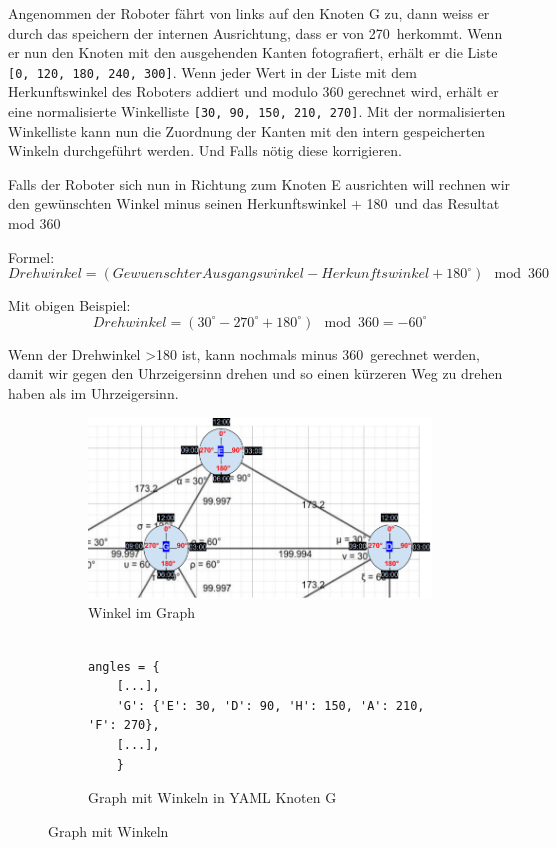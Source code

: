 Angenommen der Roboter fährt von links auf den Knoten G zu, dann weiss er durch das speichern der internen Ausrichtung, dass er von 270\textdegree\ herkommt. Wenn er nun den Knoten mit den ausgehenden Kanten fotografiert, erhält er die Liste \verb|[0, 120, 180, 240, 300]|.  Wenn jeder Wert in der Liste mit dem Herkunftswinkel des Roboters addiert und modulo 360 gerechnet wird, erhält er eine normalisierte Winkelliste \verb|[30, 90, 150, 210, 270]|. Mit der normalisierten Winkelliste kann nun die Zuordnung der Kanten mit den intern gespeicherten Winkeln durchgeführt werden. Und Falls nötig diese korrigieren.

Falls der Roboter sich nun in Richtung zum Knoten E ausrichten will rechnen wir den gewünschten Winkel minus seinen Herkunftswinkel + 180\textdegree\ und das Resultat mod 360

Formel:
\[Drehwinkel = (GewuenschterAusgangswinkel - Herkunftswinkel + 180^\circ) \mod 360\]

Mit obigen Beispiel:
\[Drehwinkel = (30^\circ - 270^\circ + 180^\circ) \mod 360 = -60^\circ\]

Wenn der Drehwinkel >180 ist, kann nochmals minus 360\textdegree\ gerechnet werden, damit wir gegen den Uhrzeigersinn drehen und so einen kürzeren Weg zu drehen haben als im Uhrzeigersinn.



\begin{figure}[H]
\centering
\begin{subfigure}{0.98\textwidth}
\centering
\includegraphics[width=0.95\linewidth]{assets/informatik-prototyp/simulator/internal-angles.png} 
\caption{Winkel im Graph}
\label{fig:labeled-graph-angles}
\end{subfigure}
\begin{subfigure}{0.8\textwidth}
\begin{footnotesize}
\begin{verbatim}

angles = {
    [...],
    'G': {'E': 30, 'D': 90, 'H': 150, 'A': 210, 'F': 270},
    [...],
    }
\end{verbatim}
\end{footnotesize}
\caption{Graph mit Winkeln in YAML Knoten G}
\label{fig:graph-yaml-angle}
\end{subfigure}
\caption{Graph mit Winkeln}
\label{fig:angle-graphs-internal}
\end{figure}

